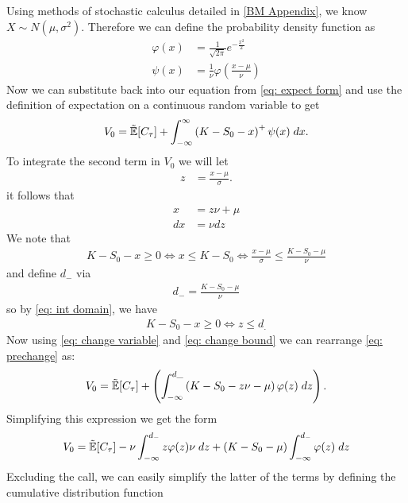 \documentclass[reqno]{amsart}
\begin{document}
Using methods of stochastic calculus detailed in \eqref{BM Appendix}, 
we know $X \sim N(\mu,\sigma^2)$.
Therefore we can define the probability density function as
\begin{align}
     \label{eq: phi-PDF}
     \varphi(x) &=\frac{1}{\sqrt{2\pi}}e^{-\frac{x^2}{2}}\\
     \psi(x) &= \frac{1}{\nu}\varphi(\frac{x-\mu}{\nu})
\end{align}
Now we can substitute back into our equation from \eqref{eq: expect form} and use the definition of expectation on a continuous random variable to get 
\begin{align} \label{eq: prechange}
     V_0 = \tilde{\mathbb{E}}[C_\tau] + \int_{-\infty}^{\infty}\left(K- S_0 - x\right)^+ \psi(x) \; dx.
\end{align}
To integrate the second term in $V_0$ we will let
\begin{align}
     z &= \frac{x-\mu}{\sigma}.
\end{align}
it follows that 
\begin{align}\label{eq: change variable}
     x &= z\nu + \mu\\
     dx &= \nu dz
\end{align}
We note that 
\begin{align} \label{eq: int domain}
    K - S_0 - x \ge 0 \Longleftrightarrow x \leq K- S_0 \Longleftrightarrow  \frac{x-\mu}{\sigma} \leq \frac{K-S_0-\mu}{\nu}
\end{align}
and define $d_-$ via
\begin{align}
      d_- =  \frac{K-S_0-\mu}{\nu}
\end{align}
so by \eqref{eq: int domain}, we have 
\begin{align} \label{eq: change bound}
     K - S_0 - x \ge 0  \Longleftrightarrow z \leq d_.
\end{align}
Now using \eqref{eq: change variable} and \eqref{eq: change bound} we can rearrange \eqref{eq: prechange} as:
\begin{align}
     V_0 = \tilde{\mathbb{E}}[C_\tau] + \left(\int_{-\infty}^{d\_}\left(K- S_0 - z\nu - \mu\right)\varphi(z) \; dz\right).
\end{align}
Simplifying this expression we get the form
\begin{align}
     V_0 = \tilde{\mathbb{E}}[C_\tau] - \nu \int_{-\infty}^{d_-}z\varphi(z)\nu \; dz +  (K- S_0 - \mu)\int_{-\infty}^{d_-}\varphi(z) \; dz 
\end{align}
Excluding the call, we can easily simplify the latter of the terms by defining the cumulative distribution function
\end{document}
